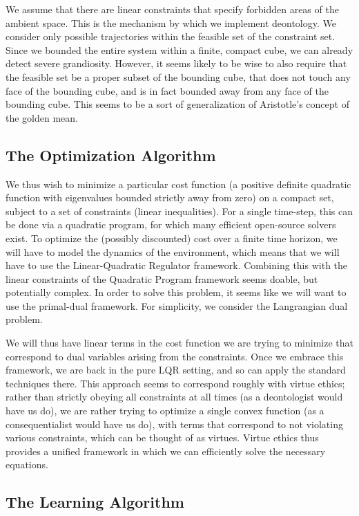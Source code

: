\documentclass[11pt]{article}
\begin{document}
We assume that there are linear constraints that specify forbidden
areas of the ambient space. This is the mechanism by which we
implement deontology. We consider only possible trajectories within
the feasible set of the constraint set. Since we bounded the entire
system within a finite, compact cube, we can already detect severe
grandiosity. However, it seems likely to be wise to also require that
the feasible set be a proper subset of the bounding cube, that does
not touch any face of the bounding cube, and is in fact bounded away
from any face of the bounding cube. This seems to be a sort of
generalization of Aristotle's concept of the golden mean.

\subsection{The Optimization Algorithm}

We thus wish to minimize a particular cost function (a positive
definite quadratic function with eigenvalues bounded strictly away
from zero) on a compact set, subject to a set of constraints (linear
inequalities). For a single time-step, this can be done via a
quadratic program, for which many efficient open-source solvers
exist. To optimize the (possibly discounted) cost over a finite time
horizon, we will have to model the dynamics of the environment, which
means that we will have to use the Linear-Quadratic Regulator
framework. Combining this with the linear constraints of the Quadratic
Program framework seems doable, but potentially complex. In order to
solve this problem, it seems like we will want to use the primal-dual
framework. For simplicity, we consider the Langrangian dual problem.

We will thus have linear terms in the cost function we are trying to
minimize that correspond to dual variables arising from the
constraints. Once we embrace this framework, we are back in the pure
LQR setting, and so can apply the standard techniques there. This
approach seems to correspond roughly with virtue ethics; rather than
strictly obeying all constraints at all times (as a deontologist would
have us do), we are rather trying to optimize a single convex function
(as a consequentialist would have us do), with terms that correspond
to not violating various constraints, which can be thought of as
virtues. Virtue ethics thus provides a unified framework in which we
can efficiently solve the necessary equations.

\subsection{The Learning Algorithm}
\end{document}
